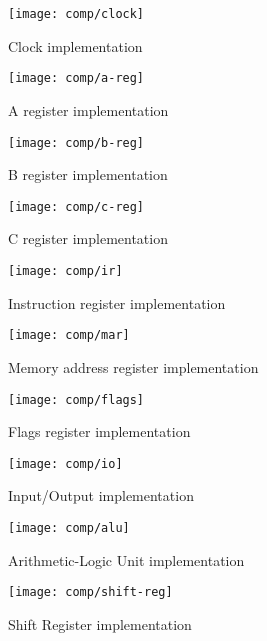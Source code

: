 

  \begin{figure}[h]
    \centering
    \texttt{[image: comp/clock]}
    \caption{Clock implementation}
    \label{clock-i}
  \end{figure}

  \begin{figure}[h]
    \centering
    \texttt{[image: comp/a-reg]}
    \caption{A register implementation}
    \label{a-reg-i}
  \end{figure}

  \begin{figure}[h]
    \centering
    \texttt{[image: comp/b-reg]}
    \caption{B register implementation}
    \label{b-reg-i}
  \end{figure}

  \begin{figure}[h]
    \centering
    \texttt{[image: comp/c-reg]}
    \caption{C register implementation}
    \label{c-reg-i}
  \end{figure}

  \begin{figure}[h]
    \centering
    \texttt{[image: comp/ir]}
    \caption{Instruction register implementation}
    \label{ir-i}
  \end{figure}

  \begin{figure}[h]
    \centering
    \texttt{[image: comp/mar]}
    \caption{Memory address register implementation}
    \label{mar-i}
  \end{figure}

  \begin{figure}[h]
    \centering
    \texttt{[image: comp/flags]}
    \caption{Flags register implementation}
    \label{flags-i}
  \end{figure}

  \begin{figure}[h]
    \centering
    \texttt{[image: comp/io]}
    \caption{Input/Output implementation}
    \label{io-i}
  \end{figure}

  \begin{figure}[h]
    \centering
    \texttt{[image: comp/alu]}
    \caption{Arithmetic-Logic Unit implementation}
    \label{alu-i}
  \end{figure}

  \begin{figure}[h]
    \centering
    \texttt{[image: comp/shift-reg]}
    \caption{Shift Register implementation}
    \label{shift-reg-i}
  \end{figure}

